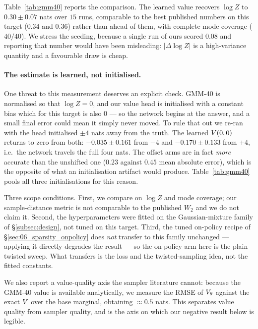 Table~\ref{tab:gmm40} reports the comparison. The learned value recovers
$\log Z$ to $0.30\pm0.07$ nats over $15$ runs, comparable to the best published
numbers on this target ($0.34$ and $0.36$) rather than ahead of them, with
complete mode coverage ($40/40$). We stress the seeding, because a single run
of ours scored $0.08$ and reporting that number would have been misleading:
$|\Delta\log Z|$ is a high-variance quantity and a favourable draw is cheap.

\paragraph{The estimate is learned, not initialised.}
One threat to this measurement deserves an explicit check. GMM-40 is normalised
so that $\log Z=0$, and our value head is initialised with a constant bias
which for this target is also $0$ --- so the network begins at the answer, and
a small final error could mean it simply never moved. To rule that out we
re-ran with the head initialised $\pm4$ nats away from the truth. The learned
$V(0,0)$ returns to zero from both: $-0.035\pm0.161$ from $-4$ and
$-0.170\pm0.133$ from $+4$, i.e.\ the network travels the full four nats. The
offset arms are in fact \emph{more} accurate than the unshifted one
($0.23$ against $0.45$ mean absolute error), which is the opposite of what an
initialisation artifact would produce. Table~\ref{tab:gmm40} pools all three
initialisations for this reason.

Three scope conditions.
First, we compare on $\log Z$ and mode coverage; our sample-distance metric is
not comparable to the published $W_2$ and we do not claim it. Second, the
hyperparameters were fitted on the Gaussian-mixture family of
\S\ref{subsec:design}, not tuned on this target. Third, the tuned on-policy
recipe of \S\ref{sec:06_sparsity_onpolicy} does \emph{not} transfer to this
family unchanged --- applying it directly degrades the result --- so the
on-policy arm here is the plain twisted sweep. What transfers is the loss and
the twisted-sampling idea, not the fitted constants.

We also report a value-quality axis the sampler literature cannot: because the
GMM-40 value is available analytically, we measure the RMSE of $V_\theta$
against the exact $V$ over the base marginal, obtaining $\approx0.5$ nats.
This separates value quality from sampler quality, and is the axis on which our
negative result below is legible.

